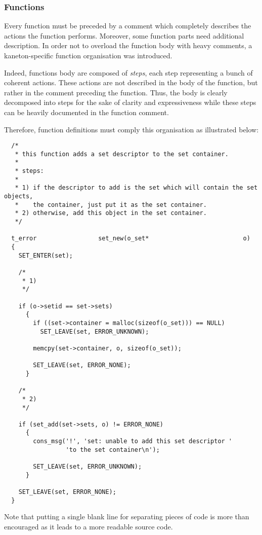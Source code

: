 \subsubsection{Functions}

Every function must be preceded by a comment which completely describes the
actions the function performs. Moreover, some function parts need additional
description. In order not to overload the function body with heavy comments,
a kaneton-specific function organisation was introduced.

Indeed, functions body are composed of \textit{steps}, each step representing
a bunch of coherent actions. These actions are not described in the body
of the function, but rather in the comment preceding the function. Thus,
the body is clearly decomposed into steps for the sake of clarity and
expressiveness while these steps can be heavily documented in the
function comment.

Therefore, function definitions must comply this organisation as illustrated
below:

\begin{verbatim}
  /*
   * this function adds a set descriptor to the set container.
   *
   * steps:
   *
   * 1) if the descriptor to add is the set which will contain the set objects,
   *    the container, just put it as the set container.
   * 2) otherwise, add this object in the set container.
   */

  t_error                 set_new(o_set*                          o)
  {
    SET_ENTER(set);

    /*
     * 1)
     */

    if (o->setid == set->sets)
      {
        if ((set->container = malloc(sizeof(o_set))) == NULL)
          SET_LEAVE(set, ERROR_UNKNOWN);

        memcpy(set->container, o, sizeof(o_set));

        SET_LEAVE(set, ERROR_NONE);
      }

    /*
     * 2)
     */

    if (set_add(set->sets, o) != ERROR_NONE)
      {
        cons_msg('!', 'set: unable to add this set descriptor '
                 'to the set container\n');

        SET_LEAVE(set, ERROR_UNKNOWN);
      }

    SET_LEAVE(set, ERROR_NONE);
  }
\end{verbatim}

Note that putting a single blank line for separating pieces of code is more
than encouraged as it leads to a more readable source code.

